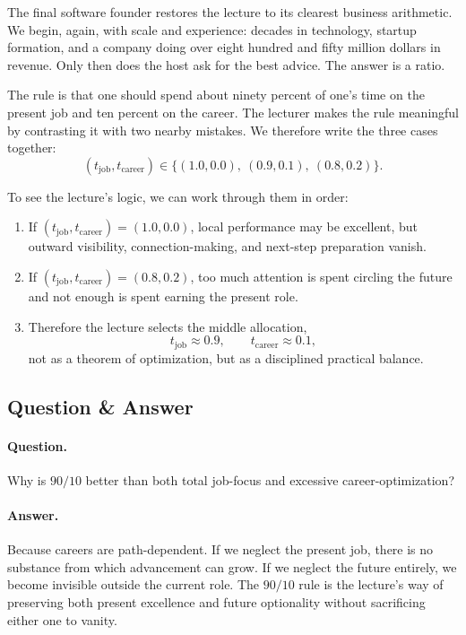 The final software founder restores the lecture to its clearest business arithmetic. We begin, again, with scale and experience: decades in technology, startup formation, and a company doing over eight hundred and fifty million dollars in revenue. Only then does the host ask for the best advice. The answer is a ratio.

The rule is that one should spend about ninety percent of one's time on the present job and ten percent on the career. The lecturer makes the rule meaningful by contrasting it with two nearby mistakes. We therefore write the three cases together:
\begin{equation}
(t_{\mathrm{job}},t_{\mathrm{career}})
\in
\{(1.0,0.0),\ (0.9,0.1),\ (0.8,0.2)\}.
\end{equation}

To see the lecture's logic, we can work through them in order:
\begin{enumerate}
\item If \((t_{\mathrm{job}},t_{\mathrm{career}})=(1.0,0.0)\), local performance may be excellent, but outward visibility, connection-making, and next-step preparation vanish.
\item If \((t_{\mathrm{job}},t_{\mathrm{career}})=(0.8,0.2)\), too much attention is spent circling the future and not enough is spent earning the present role.
\item Therefore the lecture selects the middle allocation,
\begin{equation}
t_{\mathrm{job}} \approx 0.9,
\qquad
t_{\mathrm{career}} \approx 0.1,
\end{equation}
not as a theorem of optimization, but as a disciplined practical balance.
\end{enumerate}

\subsection{Question \& Answer}

\paragraph{Question.} Why is \(90/10\) better than both total job-focus and excessive career-optimization?

\paragraph{Answer.} Because careers are path-dependent. If we neglect the present job, there is no substance from which advancement can grow. If we neglect the future entirely, we become invisible outside the current role. The \(90/10\) rule is the lecture's way of preserving both present excellence and future optionality without sacrificing either one to vanity.

